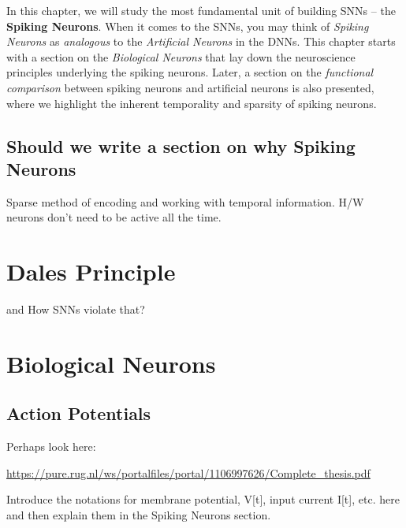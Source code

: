 In this chapter, we will study the most fundamental unit of building SNNs -- the \textbf{Spiking Neurons}. When it comes to the SNNs, you may think of \textsl{Spiking Neurons} as \textit{analogous} to the \textsl{Artificial Neurons} in the DNNs. This chapter starts with a section on the \textsl{Biological Neurons} that lay down the neuroscience principles underlying the spiking neurons. Later, a section on the \textit{functional comparison} between spiking neurons and artificial neurons is also presented, where we highlight the inherent temporality and sparsity of spiking neurons.

\subsection{Should we write a section on why Spiking Neurons}
Sparse method of encoding and working with temporal information. H/W neurons don't need to be active all the time.

\section{Dales Principle}
and How SNNs violate that?

\section{Biological Neurons} \label{sec:bio-neuron}
\subsection{Action Potentials}
Perhaps look here: 

\url{https://pure.rug.nl/ws/portalfiles/portal/1106997626/Complete_thesis.pdf}

Introduce the notations for membrane potential, V[t], input current I[t], etc. here and then explain them in the Spiking Neurons section.


\newpage
